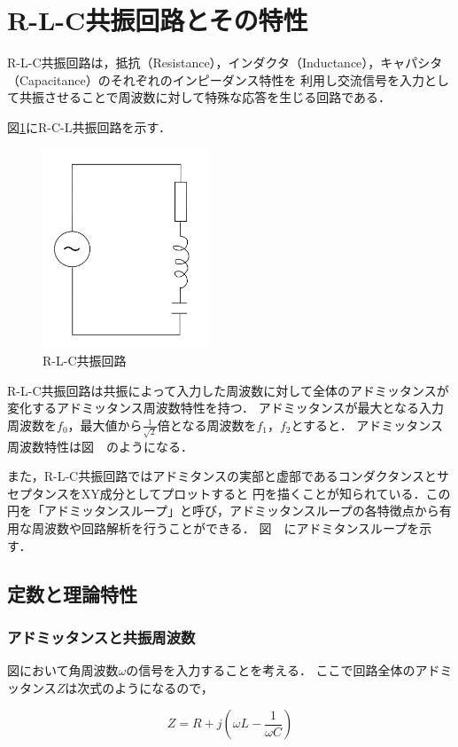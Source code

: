 \documentclass[dvipdfmx,titlepage,a4j]{jsarticle}  %
\numberwithin{equation}{section}
\begin{document}
\section{R-L-C共振回路とその特性}
R-L-C共振回路は，抵抗（Resistance），インダクタ（Inductance），キャパシタ（Capacitance）のそれぞれのインピーダンス特性を
利用し交流信号を入力として共振させることで周波数に対して特殊な応答を生じる回路である．

図\ref{fig:fig6-rcl.jpg}にR-C-L共振回路を示す．
\begin{figure}[H]
  \centering
  \includegraphics[width=5cm]{../fig/fig6-rcl.jpg}
  \caption{R-L-C共振回路}
  \label{fig:fig6-rcl.jpg}
\end{figure}

R-L-C共振回路は共振によって入力した周波数に対して全体のアドミッタンスが変化するアドミッタンス周波数特性を持つ．
アドミッタンスが最大となる入力周波数を$f_0$，最大値から$\frac{1}{\sqrt{2}}$倍となる周波数を$f_1$，$f_2$とすると．
アドミッタンス周波数特性は図　のようになる．

また，R-L-C共振回路ではアドミタンスの実部と虚部であるコンダクタンスとサセプタンスをXY成分としてプロットすると
円を描くことが知られている．この円を「アドミッタンスループ」と呼び，アドミッタンスループの各特徴点から有用な周波数や回路解析を行うことができる．
図　にアドミタンスループを示す．

\subsection{定数と理論特性}
\subsubsection{アドミッタンスと共振周波数}
図において角周波数$\omega$の信号を入力することを考える．
ここで回路全体のアドミッタンス$Z$は次式のようになるので，

\begin{equation}
  Z = R + j(\omega L - \frac{1}{\omega C})
\end{equation}
\end{document}

